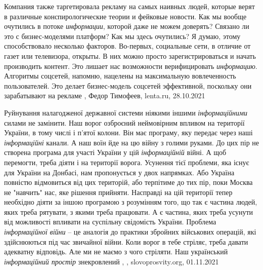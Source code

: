 Компания также таргетировала рекламу на самых наивных людей, которые верят в
различные конспирологические теории и фейковые новости. Как мы вообще очутились
в потоке \emph{информации}, которой даже не можем доверять? Связано ли это с
бизнес-моделями платформ?  Как мы здесь очутились? Я думаю, этому
способствовало несколько факторов.  Во-первых, социальные сети, в отличие от
газет или телевизора, открыты. В них можно просто зарегистрироваться и начать
производить контент. Это лишает нас возможности верифицировать
\emph{информацию}. Алгоритмы соцсетей, напомню, нацелены на максимальную
вовлеченность пользователей. Это делает бизнес-модель соцсетей эффективной,
поскольку они зарабатывают на рекламе
, 
Федор Тимофеев, lenta.ru, 28.10.2021

Руйнування налагодженої державної системи ніякими іншими \emph{інформаційними} силами
не замінити. Наш ворог озброєний неймовірним впливом на території України, в
тому числі і п’ятої колони. Він має програму, яку передає через наші
\emph{інформаційні} канали. А наш воїн йде на цю війну з голими руками. До цих пір не
створена програма для участі України у цій \emph{інформаційній} війні. А щоб
перемогти, треба діяти і на території ворога.  Усунення тієї проблеми, яка
існує для України на Донбасі, нам пропонується у двох напрямках. Або Україна
повністю відмовиться від цих територій, або терпітиме до тих пір, поки Москва
не "навчить" нас, яке рішення прийняти. Насправді на цій території тепер
необхідно діяти за іншою програмою з розумінням того, що так є частина людей,
яких треба рятувати, з якими треба працювати. А є частина, яких треба усунути
від можливості впливати на суспільну свідомість України.  Проблема
\emph{інформаційної війни} – це аналогія до практики збройних військових операцій, які
здійснюються під час звичайної війни. Коли ворог в тебе стріляє, треба давати
адекватну відповідь. Але ми не маємо з чого стріляти. Наш український
\emph{інформаційний простір} знекровлений
, , slovoprosvity.org, 01.11.2021
